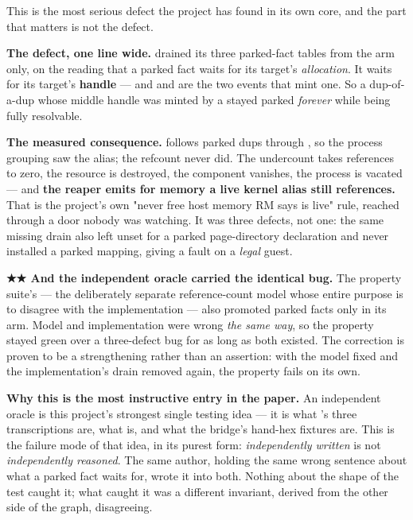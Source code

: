\documentclass[10.5pt]{article}
\begin{document}
This is the most serious defect the project has found in its own core, and the part that matters
is not the defect.

\textbf{The defect, one line wide.}  drained its three parked-fact tables
from the  arm only, on the reading that a parked fact waits for its target's
\emph{allocation}. It waits for its target's \textbf{handle} — and  and 
are the two events that mint one. So a dup-of-a-dup whose middle handle was minted by a
 stayed parked \emph{forever} while being fully resolvable.

\textbf{The measured consequence.}  follows parked dups through
, so the process grouping saw the alias; the refcount never did. The undercount
takes references to zero, the resource is destroyed, the component vanishes, the process is
vacated — and \textbf{the reaper emits  for memory a live kernel alias still
references.} That is the project's own "never free host memory RM says is live" rule, reached
through a door nobody was watching. It was three defects, not one: the same missing drain also
left  unset for a parked page-directory declaration and never installed a
parked mapping, giving a fault on a \emph{legal} guest.

\begin{warnbox}\small
\textbf{★★ And the independent oracle carried the identical bug.} The property suite's
 — the deliberately separate reference-count model whose entire purpose is to
disagree with the implementation — also promoted parked facts only in its  arm. Model
and implementation were wrong \emph{the same way}, so the property stayed green over a
three-defect bug for as long as both existed. The correction is proven to be a strengthening
rather than an assertion: with the model fixed and the implementation's drain removed again, the
property fails on its own.
\end{warnbox}

\textbf{Why this is the most instructive entry in the paper.} An independent oracle is this
project's strongest single testing idea — it is what 's three transcriptions
are, what  is, and what the bridge's hand-hex fixtures are. This is the failure
mode of that idea, in its purest form: \emph{independently written} is not \emph{independently
reasoned}. The same author, holding the same wrong sentence about what a parked fact waits for,
wrote it into both. Nothing about the shape of the test caught it; what caught it was a different
invariant, derived from the other side of the graph, disagreeing.
\end{document}

